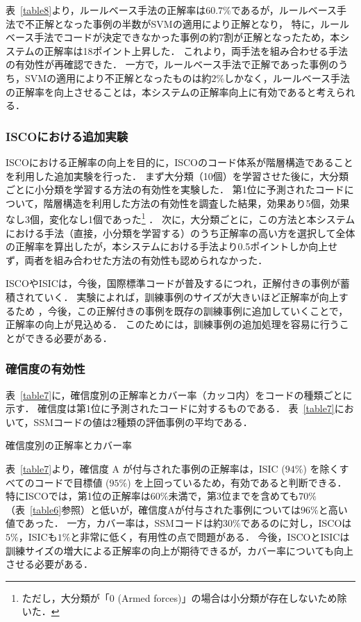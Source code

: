 \documentclass[japanese]{jnlp_1.4}
\begin{document}
表~\ref{table8}より，ルールベース手法の正解率は$60.7\%$であるが，ルールベース手法で不正解となった事例の半数がSVMの適用により正解となり，
特に，ルールベース手法でコードが決定できなかった事例の約7割が正解となったため，本システムの正解率は18ポイント上昇した．
これより，両手法を組み合わせる手法の有効性が再確認できた．
一方で，ルールベース手法で正解であった事例のうち，SVMの適用により不正解となったものは約$2\%$しかなく，ルールベース手法の正解率を向上させることは，本システムの正解率向上に有効であると考えられる．

\subsubsection*{ISCOにおける追加実験}

ISCOにおける正解率の向上を目的に，ISCOのコード体系が階層構造であることを利用した追加実験を行った．
まず大分類（10個）を学習させた後に，大分類ごとに小分類を学習する方法の有効性を実験した． 
第1位に予測されたコードについて，階層構造を利用した方法の有効性を調査した結果，効果あり5個，効果なし3個，変化なし1個であった\footnote{ただし，大分類が「0 (Armed forces)」の場合は小分類が存在しないため除いた．} ．
次に，大分類ごとに，この方法と本システムにおける手法（直接，小分類を学習する）のうち正解率の高い方を選択して全体の正解率を算出したが，本システムにおける手法より0.5ポイントしか向上せず，両者を組み合わせた方法の有効性も認められなかった．

ISCOやISICは，今後，国際標準コードが普及するにつれ，正解付きの事例が蓄積されていく．
実験によれば，訓練事例のサイズが大きいほど正解率が向上するため \cite{Takahashi_et_al05c}，今後，この正解付きの事例を既存の訓練事例に追加していくことで，正解率の向上が見込める．
このためには，訓練事例の追加処理を容易に行うことができる必要がある． 

\subsubsection{確信度の有効性}

表~\ref{table7}に，確信度別の正解率とカバー率（カッコ内）をコードの種類ごとに示す．
確信度は第1位に予測されたコードに対するものである．
表~\ref{table7}において，SSMコードの値は2種類の評価事例の平均である．

\begin{table}[t]
\caption{確信度別の正解率とカバー率}
\label{table7}

\end{table}

表~\ref{table7}より，確信度 A が付与された事例の正解率は，ISIC ($94\%$) を除くすべてのコードで目標値 ($95\%$) を上回っているため，有効であると判断できる．
特にISCOでは，第1位の正解率は$60\%$未満で，第3位までを含めても$70\%$（表~\ref{table6}参照）と低いが，確信度Aが付与された事例については$96\%$と高い値であった． 
一方，カバー率は，SSMコードは約$30\%$であるのに対し，ISCOは$5\%$，ISICも$1\%$と非常に低く，有用性の点で問題がある．
今後，ISCOとISICは訓練サイズの増大による正解率の向上が期待できるが，カバー率についても向上させる必要がある．
  
\end{document}
